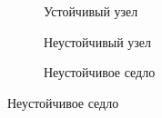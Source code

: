 \begin{figure}[H]
  \centering

  \begin{subfigure}[b]{0.3\textwidth}
    
    \caption{Устойчивый узел}

  \end{subfigure}
  \qquad
  \begin{subfigure}[b]{0.3\textwidth}

    
    \caption{Неустойчивый узел}

  \end{subfigure}
  \qquad
  \begin{subfigure}[b]{0.3\textwidth}

    
    \caption{Неустойчивое седло}

  \end{subfigure}
\end{figure}